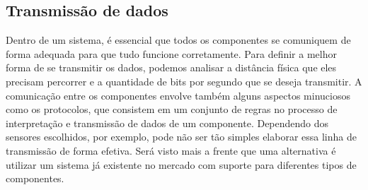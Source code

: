 \subsection{Transmissão de dados}
Dentro de um sistema, é essencial que todos os componentes se comuniquem de forma adequada para que tudo funcione corretamente. Para definir a melhor forma de se transmitir os dados, podemos analisar a distância física que eles precisam percorrer e a quantidade de bits por segundo que se deseja transmitir. A comunicação entre os componentes envolve também alguns aspectos minuciosos como os protocolos, que consistem em um conjunto de regras no processo de interpretação e transmissão de dados de um componente.  Dependendo dos sensores escolhidos, por exemplo, pode não ser tão simples elaborar essa linha de transmissão de forma efetiva. Será visto mais a frente que uma alternativa é utilizar um sistema já existente no mercado com suporte para diferentes tipos de componentes.


